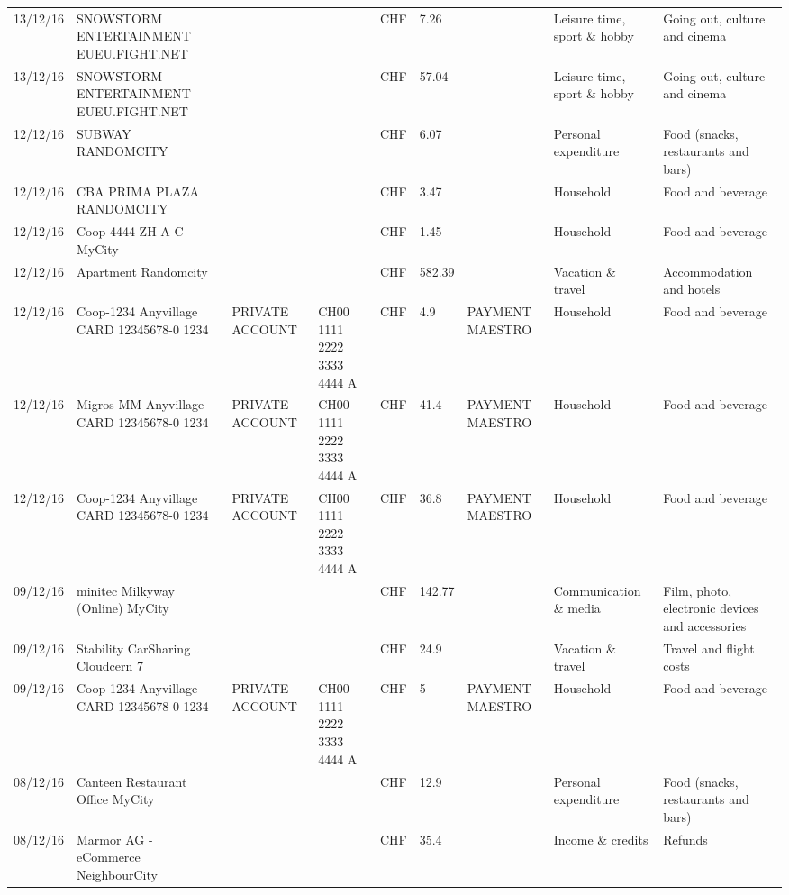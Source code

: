 \begin{landscape}
\begin{center}
\begin{longtable}{lllllllll}
		13/12/16 & SNOWSTORM ENTERTAINMENT EUEU.FIGHT.NET &       &       & CHF   & 7.26  &       & Leisure time, sport \& hobby & Going out, culture and cinema \\
		13/12/16 & SNOWSTORM ENTERTAINMENT EUEU.FIGHT.NET &       &       & CHF   & 57.04 &       & Leisure time, sport \& hobby & Going out, culture and cinema \\
		12/12/16 & SUBWAY                   RANDOMCITY &       &       & CHF   & 6.07  &       & Personal expenditure & Food (snacks, restaurants and bars) \\
		12/12/16 & CBA PRIMA PLAZA        RANDOMCITY &       &       & CHF   & 3.47  &       & Household & Food and beverage \\
		12/12/16 & Coop-4444 ZH A C   MyCity &       &       & CHF   & 1.45  &       & Household & Food and beverage \\
		12/12/16 & Apartment               Randomcity &       &       & CHF   & 582.39 &       & Vacation \& travel & Accommodation and hotels \\
		12/12/16 & Coop-1234 Anyvillage CARD 12345678-0 1234 & PRIVATE ACCOUNT & CH00 1111 2222 3333 4444 A & CHF   & 4.9   & PAYMENT MAESTRO & Household & Food and beverage \\
		12/12/16 & Migros MM Anyvillage CARD 12345678-0 1234 & PRIVATE ACCOUNT & CH00 1111 2222 3333 4444 A & CHF   & 41.4  & PAYMENT MAESTRO & Household & Food and beverage \\
		12/12/16 & Coop-1234 Anyvillage CARD 12345678-0 1234 & PRIVATE ACCOUNT & CH00 1111 2222 3333 4444 A & CHF   & 36.8  & PAYMENT MAESTRO & Household & Food and beverage \\
		09/12/16 & minitec Milkyway (Online) MyCity &       &       & CHF   & 142.77 &       & Communication \& media & Film, photo, electronic devices and accessories \\
		09/12/16 & Stability CarSharing      Cloudcern 7 &       &       & CHF   & 24.9  &       & Vacation \& travel & Travel and flight costs \\
		09/12/16 & Coop-1234 Anyvillage CARD 12345678-0 1234 & PRIVATE ACCOUNT & CH00 1111 2222 3333 4444 A & CHF   & 5     & PAYMENT MAESTRO & Household & Food and beverage \\
		08/12/16 & Canteen Restaurant Office      MyCity &       &       & CHF   & 12.9  &       & Personal expenditure & Food (snacks, restaurants and bars) \\
		08/12/16 & Marmor AG - eCommerce     NeighbourCity &       &       & CHF   & 35.4  &       & Income \& credits & Refunds \\

\end{longtable}
\end{center}
\end{landscape}
